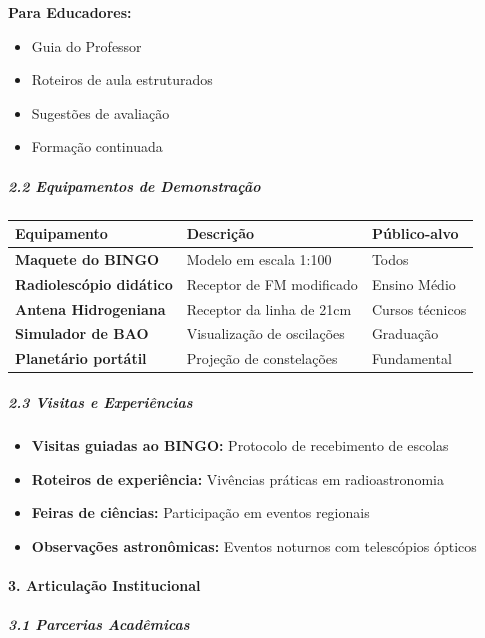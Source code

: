 \textbf{Para Educadores:}

\begin{itemize}
\item Guia do Professor
\item Roteiros de aula estruturados
\item Sugestões de avaliação
\item Formação continuada
\end{itemize}

\subparagraph{2.2 Equipamentos de Demonstração}

\bigskip\noindent
\begin{tabular}{p{}p{}p{}}
\toprule
Equipamento & Descrição & Público-alvo \\
\hline
\textbf{Maquete do BINGO} & Modelo em escala 1:100 & Todos \\
\textbf{Radiolescópio didático} & Receptor de FM modificado & Ensino Médio \\
\textbf{Antena Hidrogeniana} & Receptor da linha de 21cm & Cursos técnicos \\
\textbf{Simulador de BAO} & Visualização de oscilações & Graduação \\
\textbf{Planetário portátil} & Projeção de constelações & Fundamental \\
\bottomrule
\end{tabular}

\bigskip

\subparagraph{2.3 Visitas e Experiências}

\begin{itemize}
\item \textbf{Visitas guiadas ao BINGO:} Protocolo de recebimento de escolas
\item \textbf{Roteiros de experiência:} Vivências práticas em radioastronomia
\item \textbf{Feiras de ciências:} Participação em eventos regionais
\item \textbf{Observações astronômicas:} Eventos noturnos com telescópios ópticos
\end{itemize}

\paragraph{3. Articulação Institucional}

\subparagraph{3.1 Parcerias Acadêmicas}

